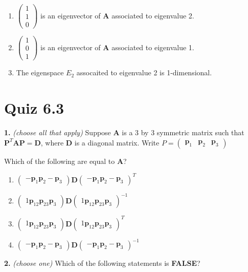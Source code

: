 \documentclass[10pt,a4paper]{article}
\begin{document}
\begin{enumerate}[label=(\Alph*)]
\item \(\begin{pmatrix}1\\1\\0\end{pmatrix}\) is an eigenvector of \(\mathbf{A}\) associated to eigenvalue 2.
\item \(\begin{pmatrix}1\\0\\1\end{pmatrix}\) is an eigenvector of \(\mathbf{A}\) associated to eigenvalue 1.
\item The eigenspace \(E_2\) assocaited to eigenvalue 2 is 1-dimensional.
\end{enumerate}
\smallskip
\section{Quiz 6.3}
\textbf{1.} \textit{(choose all that apply)} Suppose \(\mathbf{A}\) is a 3 by 3 symmetric matrix such that \(\mathbf{P}^T\mathbf{AP=D}\), where \(\mathbf{D}\) is a diagonal matrix. Write \(P=\begin{pmatrix}\mathbf{p}_1&\mathbf{p}_2&\mathbf{p}_3\end{pmatrix}\)

Which of the following are equal to \(\mathbf{A}\)?

\begin{enumerate}[label=(\Alph*)]
\item \(\begin{pmatrix}-\mathbf{p}_1\mathbf{p}_2-\mathbf{p}_3\end{pmatrix}\mathbf{D}\begin{pmatrix}-\mathbf{p}_1\mathbf{p}_2-\mathbf{p}_3\end{pmatrix}^T\)
\item \(\begin{pmatrix}1\mathbf{p}_12\mathbf{p}_23\mathbf{p}_3\end{pmatrix}\mathbf{D}\begin{pmatrix}1\mathbf{p}_12\mathbf{p}_23\mathbf{p}_3\end{pmatrix}^{-1}\)
\item \(\begin{pmatrix}1\mathbf{p}_12\mathbf{p}_23\mathbf{p}_3\end{pmatrix}\mathbf{D}\begin{pmatrix}1\mathbf{p}_12\mathbf{p}_23\mathbf{p}_3\end{pmatrix}^{T}\)
\item \(\begin{pmatrix}-\mathbf{p}_1\mathbf{p}_2-\mathbf{p}_3\end{pmatrix}\mathbf{D}\begin{pmatrix}-\mathbf{p}_1\mathbf{p}_2-\mathbf{p}_3\end{pmatrix}^{-1}\)
\end{enumerate}
\smallskip
\textbf{2.} \textit{(choose one)} Which of the following statements is \textbf{FALSE}?
\end{document}
